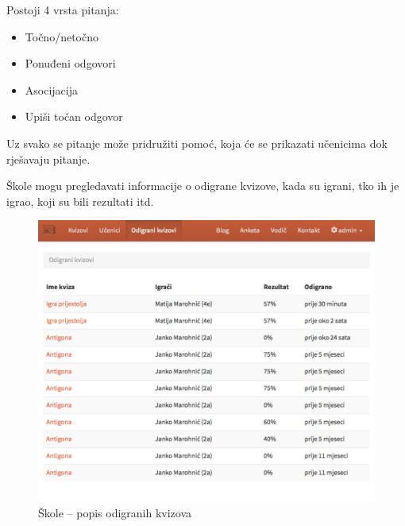 \documentclass{scrreprt}
\begin{document}
Postoji 4 vrsta pitanja:

\begin{itemize}
  \item Točno/netočno
  \item Ponuđeni odgovori
  \item Asocijacija
  \item Upiši točan odgovor
\end{itemize}

Uz svako se pitanje može pridružiti pomoć, koja će se prikazati učenicima dok
rješavaju pitanje.

Škole mogu pregledavati informacije o odigrane kvizove, kada su igrani, tko ih
je igrao, koji su bili rezultati itd.

\begin{figure}[H]
  \includegraphics[width=\textwidth, clip=true, trim=0 10cm 0 0, fbox]{school/played_quizzes}
  \caption{Škole -- popis odigranih kvizova}
\end{figure}
\end{document}

